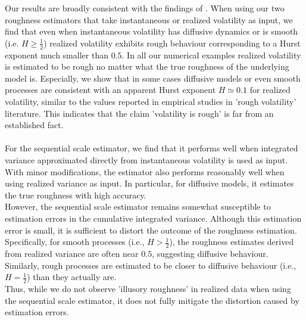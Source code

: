 \documentclass{article}
\begin{document}
Our results are broadly consistent with the findings of \cite{cont}. When using our two roughness estimators that take instantaneous or realized volatility as input, we find that even when instantaneous volatility has diffusive dynamics or is smooth (i.e. $H\geq \frac{1}{2}$) realized volatility exhibits rough behaviour corresponding to a Hurst exponent much smaller than $0.5$. In all our numerical examples realized volatility is estimated to be rough no matter what the true roughness of the underlying model is. Especially, we show that in some cases diffusive models or even smooth processes are consistent with an apparent Hurst exponent $H\simeq 0.1$ for realized volatility, similar to the values reported in empirical studies in 'rough volatility' literature. This indicates that the claim 'volatility is rough' is far from an established fact.\\\\
For the sequential scale estimator, we find that it performs well when integrated variance approximated directly from instantaneous volatility is used as input. With minor modifications, the estimator also performs reasonably well when using realized variance as input. In particular, for diffusive models, it estimates the true roughness with high accuracy. \\
However, the sequential scale estimator remains somewhat susceptible to estimation errors in the cumulative integrated variance. Although this estimation error is small, it is sufficient to distort the outcome of the roughness estimation. Specifically, for smooth processes (i.e., $H > \frac{1}{2}$), the roughness estimates derived from realized variance are often near $0.5$, suggesting diffusive behaviour. Similarly, rough processes are estimated to be closer to diffusive behaviour (i.e., $H = \frac{1}{2}$) than they actually are. \\
Thus, while we do not observe 'illusory roughness' in realized data when using the sequential scale estimator, it does not fully mitigate the distortion caused by estimation errors.
\end{document}

